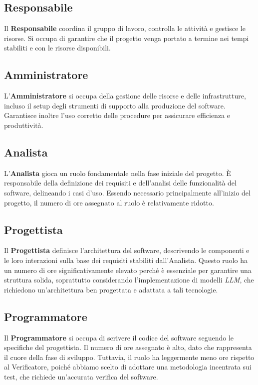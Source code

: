 \documentclass{article}
\begin{document}
\subsection{Responsabile}
Il \textbf{Responsabile} coordina il gruppo di lavoro, controlla le attività e gestisce le risorse. Si occupa di garantire che il progetto venga portato a termine nei tempi stabiliti e con le risorse disponibili.

\subsection{Amministratore}
L'\textbf{Amministratore} si occupa della gestione delle risorse e delle infrastrutture, incluso il setup degli strumenti di supporto alla produzione del software. Garantisce inoltre l’uso corretto delle procedure per assicurare efficienza e produttività.

\subsection{Analista}
L'\textbf{Analista} gioca un ruolo fondamentale nella fase iniziale del progetto. È responsabile della definizione dei requisiti e dell’analisi delle funzionalità del software, delineando i casi d'uso. Essendo necessario principalmente all'inizio del progetto, il numero di ore assegnato al ruolo è relativamente ridotto.

\subsection{Progettista}
Il \textbf{Progettista} definisce l'architettura del software, descrivendo le componenti e le loro interazioni sulla base dei requisiti stabiliti dall'Analista. Questo ruolo ha un numero di ore significativamente elevato perché è essenziale per garantire una struttura solida, soprattutto considerando l’implementazione di modelli \emph{LLM}, che richiedono un'architettura ben progettata e adattata a tali tecnologie.

\subsection{Programmatore}
Il \textbf{Programmatore} si occupa di scrivere il codice del software seguendo le specifiche del progettista. Il numero di ore assegnato è alto, dato che rappresenta il cuore della fase di sviluppo. Tuttavia, il ruolo ha leggermente meno ore rispetto al Verificatore, poiché abbiamo scelto di adottare una metodologia incentrata sui test, che richiede un’accurata verifica del software.
\end{document}
